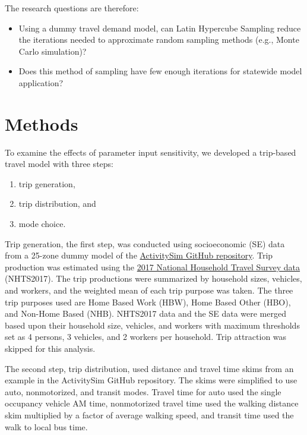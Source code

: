 \documentclass[3p, authoryear, review]{elsarticle} %
\providecommand{\tightlist}{%
  \setlength{\itemsep}{0pt}\setlength{\parskip}{0pt}}
\begin{document}
The research questions are therefore:

\begin{itemize}
\tightlist
\item
  Using a dummy travel demand model, can Latin Hypercube Sampling reduce the iterations needed to approximate random sampling methods (e.g., Monte Carlo simulation)?
\item
  Does this method of sampling have few enough iterations for statewide model application?
\end{itemize}

\hypertarget{methods}{%
\section{Methods}\label{methods}}

To examine the effects of parameter input sensitivity, we developed a trip-based travel model with three steps:

\begin{enumerate}
\def\labelenumi{\arabic{enumi}.}
\tightlist
\item
  trip generation,
\item
  trip distribution, and
\item
  mode choice.
\end{enumerate}

Trip generation, the first step, was conducted using socioeconomic (SE) data from a 25-zone dummy model of the \href{https://github.com/ActivitySim/activitysim}{ActivitySim GitHub repository}. Trip production was estimated using the \href{https://github.com/byu-transpolab/nhts2017}{2017 National Household Travel Survey data} (NHTS2017). The trip productions were summarized by household sizes, vehicles, and workers, and the weighted mean of each trip purpose was taken. The three trip purposes used are Home Based Work (HBW), Home Based Other (HBO), and Non-Home Based (NHB). NHTS2017 data and the SE data were merged based upon their household size, vehicles, and workers with maximum thresholds set as 4 persons, 3 vehicles, and 2 workers per household. Trip attraction was skipped for this analysis.

The second step, trip distribution, used distance and travel time skims from an example in the ActivitySim GitHub repository. The skims were simplified to use auto, nonmotorized, and transit modes. Travel time for auto used the single occupancy vehicle AM time, nonmotorized travel time used the walking distance skim multiplied by a factor of average walking speed, and transit time used the walk to local bus time.
\end{document}
